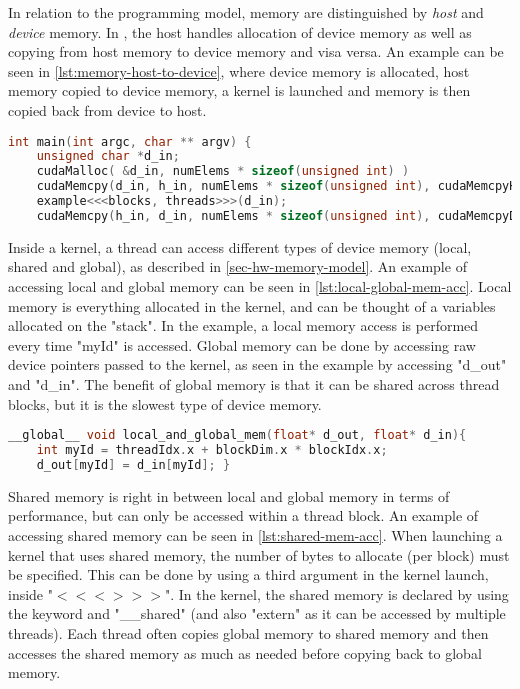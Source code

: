 In relation to the \cuda{} programming model, memory are distinguished by \textit{host} and \textit{device} memory.
In \cuda{}, the host handles allocation of device memory as well as copying from host memory to device memory and visa versa.
An example can be seen in \autoref{lst:memory-host-to-device}, where device memory is allocated, host memory copied to device memory, a kernel is launched and memory is then copied back from device to host.
\begin{lstlisting}[language=C++,caption={Example of allocation and copying from host to device},label=lst:memory-host-to-device]
int main(int argc, char ** argv) {
	unsigned char *d_in;
	cudaMalloc( &d_in, numElems * sizeof(unsigned int) )
	cudaMemcpy(d_in, h_in, numElems * sizeof(unsigned int), cudaMemcpyHostToDevice)
	example<<<blocks, threads>>>(d_in);
	cudaMemcpy(h_in, d_in, numElems * sizeof(unsigned int), cudaMemcpyDeviceToHost) }
\end{lstlisting}
Inside a kernel, a thread can access different types of device memory (local, shared and global), as described in \autoref{sec-hw-memory-model}.
An example of accessing local and global memory can be seen in \autoref{lst:local-global-mem-acc}.
Local memory is everything allocated in the kernel, and can be thought of a variables allocated on the "stack". In the example, a local memory access is performed every time "myId" is accessed.
Global memory can be done by accessing raw device pointers passed to the kernel, as seen in the example by accessing "d\_out" and "d\_in".
The benefit of global memory is that it can be shared across thread blocks, but it is the slowest type of device memory.
\begin{lstlisting}[language=C,caption={Local and global memory access},label=lst:local-global-mem-acc]
__global__ void local_and_global_mem(float* d_out, float* d_in){
	int myId = threadIdx.x + blockDim.x * blockIdx.x;
	d_out[myId] = d_in[myId]; }
\end{lstlisting}
Shared memory is right in between local and global memory in terms of performance, but can only be accessed within a thread block.
An example of accessing shared memory can be seen in \autoref{lst:shared-mem-acc}.
When launching a kernel that uses shared memory, the number of bytes to allocate (per block) must be specified.
This can be done by using a third argument in the kernel launch, inside "$<<< >>>$".
In the kernel, the shared memory is declared by using the keyword and "\_\_shared" (and also "extern" as it can be accessed by multiple threads).
Each thread often copies global memory to shared memory and then accesses the shared memory as much as needed before copying back to global memory.

